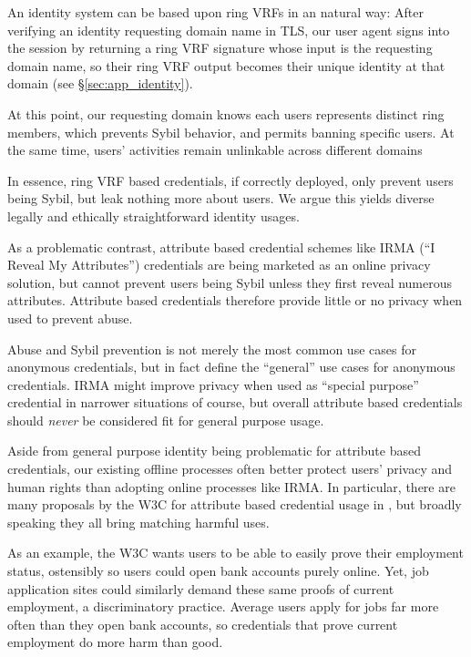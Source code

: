 An identity system can be based upon ring VRFs in an natural way:
After verifying an identity requesting domain name in TLS,
our user agent signs into the session by returning a ring VRF
signature whose input is the requesting domain name, so their
ring VRF output becomes their unique identity at that domain
(see \S\ref{sec:app_identity}).

At this point, our requesting domain knows each users represents
distinct ring members, which prevents Sybil behavior, and permits
banning specific users.
At the same time, users' activities remain unlinkable across different
domains

In essence, ring VRF based credentials, if correctly deployed, only
prevent users being Sybil, but leak nothing more about users.  We argue
this yields diverse legally and ethically straightforward identity usages.

As a problematic contrast, attribute based credential schemes like
IRMA (``I Reveal My Attributes'') credentials \cite{IRMAcredentials}
are being marketed as an online privacy solution, but cannot prevent
users being Sybil unless they first reveal numerous attributes.
Attribute based credentials therefore provide little or no privacy
when used to prevent abuse.

Abuse and Sybil prevention is not merely the most common use cases for
anonymous credentials, but in fact define the ``general'' use cases for
anonymous credentials.
IRMA might improve privacy when used as ``special purpose'' credential 
in narrower situations of course, but overall attribute based credentials
should {\it never} be considered fit for general purpose usage.

Aside from general purpose identity being problematic for attribute based
credentials, our existing offline processes often better protect users'
privacy and human rights than adopting online processes like IRMA.
%
In particular, there are many proposals by the W3C for attribute based
credential usage in \cite{w3c_vc_use_cases}, but broadly speaking they
all bring matching harmful uses.  %

As an example, the W3C wants users to be able to easily prove their
employment status, ostensibly so users could open bank accounts purely
online.  Yet, job application sites could similarly demand these same
proofs of current employment, a discriminatory practice.
Average users apply for jobs far more often than they open bank accounts,
so credentials that prove current employment do more harm than good.

